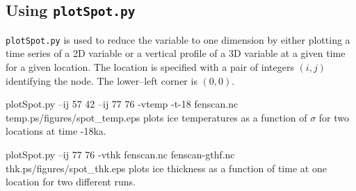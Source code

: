 \subsection{Using \texttt{plotSpot.py}}
\texttt{plotSpot.py} is used to reduce the variable to one dimension by either plotting a time series of a 2D variable or a vertical profile of a 3D variable at a given time for a given location. The location is specified with a pair of integers $(i,j)$ identifying the node. The lower--left corner is $(0,0)$. 

\begin{pycf}{plotSpot.py --ij 57 42 --ij 77 76 -vtemp  -t-18 fenscan.nc temp.ps}{\dir/figures/spot_temp.eps}
plots ice temperatures as a function of $\sigma$ for two locations at time -18ka.  
\end{pycf}

\begin{pycf}{plotSpot.py --ij 77 76 -vthk  fenscan.nc fenscan-gthf.nc thk.ps}{\dir/figures/spot_thk.eps}
plots ice thickness as a function of time at one location for two different runs.
\end{pycf}
